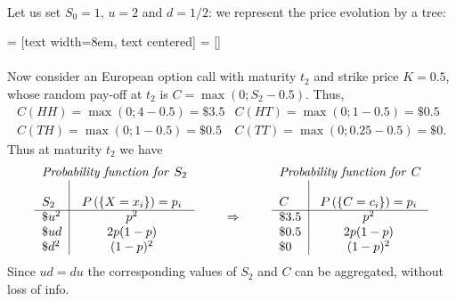 \documentclass[smaller]{beamer}\usepackage[]{graphicx}\usepackage[]{color}
\renewcommand{\Pr}{P}
\begin{document}
\begin{frame}{\secname}
  \framesubtitle{\subsecname}
  \begin{example}[continued]
  \begin{footnotesize}
  Let us set $S_0=1$, $u=2$ and $d=1/2$: we represent the price evolution by a tree:


   = [text width=8em, text centered]
   = []
  \end{footnotesize}
  \end{example}
\end{frame}

\begin{frame}{\secname}
\framesubtitle{\subsecname}
  \begin{example}[continued]
  Now consider an European option call with maturity $t_2$ and strike price $K=0.5$, whose random pay-off at $t_2$ is $C=\max(0;S_2-0.5)$. Thus,
  \begin{eqnarray*}
  C(HH)=\max(0;4-0.5)=\$ 3.5 & C(HT)=\max(0;1-0.5)=\$ 0.5 \\
  C(TH)=\max(0;1-0.5)=\$ 0.5 & C(TT)=\max(0;0.25-0.5)=\$ 0.
  \end{eqnarray*}
  Thus at maturity $t_2$ we have
  \begin{equation*}
  \begin{tabular}{l|cll|c}
  \multicolumn{2}{l}{\emph{Probability function for }$S_2$} &  &
  \multicolumn{2}{l}{\emph{Probability function for }$C$} \\
  &  &  &  &  \\
  $S_2$ & $\Pr \left(\{ X=x_{i} \}\right) =p_{i}$ &  & $C$ & $\Pr \left(\{
  C=c_{i}  \}\right) =p_{i}$ \\ \cline{1-2}\cline{4-5}
  $\$ u^2$ & $p^2$ & $\qquad \Rightarrow \qquad $ & $\$ 3.5$ & $p^2$
  \\
  $\$ ud$ & $2p(1-p)$ &  & $\$ 0.5$ & $2p(1-p)$ \\
  $\$ d^2$ & $(1-p)^2$  &  & $\$ 0$ & $(1-p)^2$%
  \end{tabular}%
  \end{equation*}
  \tiny{Since $ud=du$ the corresponding values of $S_2$ and $C$ can be aggregated, without loss of info.}
  \end{example}
\end{frame}%
\end{document}
